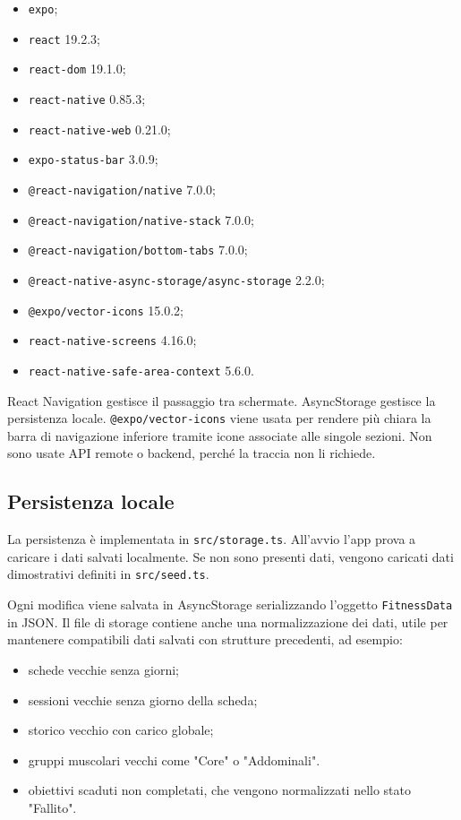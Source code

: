 \documentclass[11pt,a4paper]{article}
\begin{document}
\begin{itemize}
  \item \texttt{expo};
  \item \texttt{react} 19.2.3;
  \item \texttt{react-dom} 19.1.0;
  \item \texttt{react-native} 0.85.3;
  \item \texttt{react-native-web} 0.21.0;
  \item \texttt{expo-status-bar} 3.0.9;
  \item \texttt{@react-navigation/native} 7.0.0;
  \item \texttt{@react-navigation/native-stack} 7.0.0;
  \item \texttt{@react-navigation/bottom-tabs} 7.0.0;
  \item \texttt{@react-native-async-storage/async-storage} 2.2.0;
  \item \texttt{@expo/vector-icons} 15.0.2;
  \item \texttt{react-native-screens} 4.16.0;
  \item \texttt{react-native-safe-area-context} 5.6.0.
\end{itemize}

React Navigation gestisce il passaggio tra schermate. AsyncStorage gestisce la persistenza locale. \texttt{@expo/vector-icons} viene usata per rendere più chiara la barra di navigazione inferiore tramite icone associate alle singole sezioni. Non sono usate API remote o backend, perché la traccia non li richiede.

\subsection{Persistenza locale}

La persistenza è implementata in \texttt{src/storage.ts}. All'avvio l'app prova a caricare i dati salvati localmente. Se non sono presenti dati, vengono caricati dati dimostrativi definiti in \texttt{src/seed.ts}.

Ogni modifica viene salvata in AsyncStorage serializzando l'oggetto \texttt{FitnessData} in JSON. Il file di storage contiene anche una normalizzazione dei dati, utile per mantenere compatibili dati salvati con strutture precedenti, ad esempio:

\begin{itemize}
  \item schede vecchie senza giorni;
  \item sessioni vecchie senza giorno della scheda;
  \item storico vecchio con carico globale;
  \item gruppi muscolari vecchi come "Core" o "Addominali".
  \item obiettivi scaduti non completati, che vengono normalizzati nello stato "Fallito".
\end{itemize}
\end{document}
